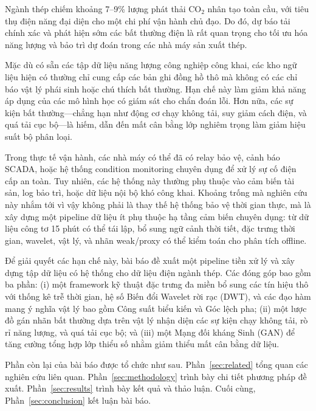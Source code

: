 \documentclass[conference]{IEEEtran}
\begin{document}
Ngành thép chiếm khoảng 7--9\% lượng phát thải CO$_2$ nhân tạo toàn cầu, với tiêu thụ điện năng đại diện cho một chi phí vận hành chủ đạo. Do đó, dự báo tải chính xác và phát hiện sớm các bất thường điện là rất quan trọng cho tối ưu hóa năng lượng và bảo trì dự đoán trong các nhà máy sản xuất thép.

Mặc dù có sẵn các tập dữ liệu năng lượng công nghiệp công khai, các kho ngữ liệu hiện có thường chỉ cung cấp các bản ghi đồng hồ thô mà không có các chỉ báo vật lý phái sinh hoặc chú thích bất thường. Hạn chế này làm giảm khả năng áp dụng của các mô hình học có giám sát cho chẩn đoán lỗi. Hơn nữa, các sự kiện bất thường---chẳng hạn như động cơ chạy không tải, suy giảm cách điện, và quá tải cục bộ---là hiếm, dẫn đến mất cân bằng lớp nghiêm trọng làm giảm hiệu suất bộ phân loại.

Trong thực tế vận hành, các nhà máy có thể đã có relay bảo vệ, cảnh báo SCADA, hoặc hệ thống condition monitoring chuyên dụng để xử lý sự cố điện cấp an toàn. Tuy nhiên, các hệ thống này thường phụ thuộc vào cảm biến tài sản, log bảo trì, hoặc dữ liệu nội bộ khó công khai. Khoảng trống mà nghiên cứu này nhắm tới vì vậy không phải là thay thế hệ thống bảo vệ thời gian thực, mà là xây dựng một pipeline dữ liệu ít phụ thuộc hạ tầng cảm biến chuyên dụng: từ dữ liệu công tơ 15 phút có thể tái lập, bổ sung ngữ cảnh thời tiết, đặc trưng thời gian, wavelet, vật lý, và nhãn weak/proxy có thể kiểm toán cho phân tích offline.

Để giải quyết các hạn chế này, bài báo đề xuất một pipeline tiền xử lý và xây dựng tập dữ liệu có hệ thống cho dữ liệu điện ngành thép. Các đóng góp bao gồm ba phần: (i) một framework kỹ thuật đặc trưng đa miền bổ sung các tín hiệu thô với thống kê trễ thời gian, hệ số Biến đổi Wavelet rời rạc (DWT), và các đạo hàm mang ý nghĩa vật lý bao gồm Công suất biểu kiến và Góc lệch pha; (ii) một lược đồ gán nhãn bất thường dựa trên vật lý nhận diện các sự kiện chạy không tải, rò rỉ năng lượng, và quá tải cục bộ; và (iii) một Mạng đối kháng Sinh (GAN) để tăng cường tổng hợp lớp thiểu số nhằm giảm thiểu mất cân bằng dữ liệu.

Phần còn lại của bài báo được tổ chức như sau. Phần~\ref{sec:related} tổng quan các nghiên cứu liên quan. Phần~\ref{sec:methodology} trình bày chi tiết phương pháp đề xuất. Phần~\ref{sec:results} trình bày kết quả và thảo luận. Cuối cùng, Phần~\ref{sec:conclusion} kết luận bài báo.

\end{document}
